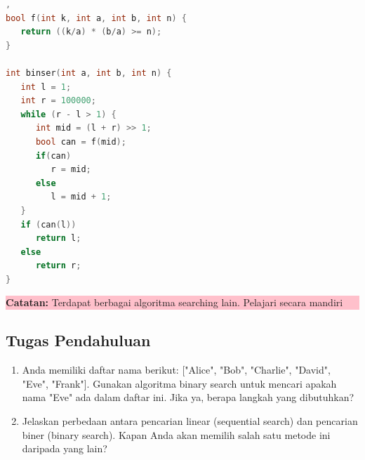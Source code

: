 \begin{lstlisting}[language=c,caption=Implementasi Binary Search],   
bool f(int k, int a, int b, int n) {
   return ((k/a) * (b/a) >= n);
}

int binser(int a, int b, int n) {
   int l = 1;
   int r = 100000;
   while (r - l > 1) {
      int mid = (l + r) >> 1;
      bool can = f(mid);
      if(can)
         r = mid;
      else
         l = mid + 1;
   }
   if (can(l))
      return l;
   else
      return r;
}
\end{lstlisting}

\begin{center}
    \colorbox{pink}{\parbox{0.8\linewidth}{\textbf{Catatan:} Terdapat berbagai algoritma searching lain. Pelajari secara mandiri}}
\end{center}

\subsection{Tugas Pendahuluan}
\begin{enumerate}
    \item Anda memiliki daftar nama berikut: ["Alice", "Bob", "Charlie", "David", "Eve", "Frank"].
          Gunakan algoritma binary search untuk mencari apakah nama "Eve" ada dalam daftar ini.
          Jika ya, berapa langkah yang dibutuhkan?
    \item Jelaskan perbedaan antara pencarian linear (sequential search) dan pencarian biner (binary search).
          Kapan Anda akan memilih salah satu metode ini daripada yang lain?
\end{enumerate}
